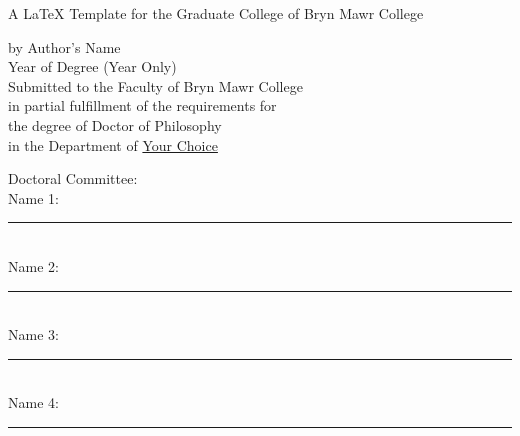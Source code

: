 \thispagestyle{plain}
\begin{titlepage}
   
   \begin{center}
        \vspace*{1in}
        A LaTeX Template for the Graduate College of Bryn Mawr College
        \vspace{2.0in} 
        
        by Author's Name\\
        Year of Degree (Year Only)\\
        \vspace{1.0in}
        \singlespace
        Submitted to the Faculty of Bryn Mawr College\\
        in partial fulfillment of the requirements for\\
        the degree of Doctor of Philosophy\\
        in the Department of \underline{Your Choice}
        \vspace{2.0in}
        
   \end{center}
   \singlespace
   Doctoral Committee:\\
   \noindent Name 1:~\rule{4cm}{0.15mm}\\
   Name 2:~\rule{4cm}{0.15mm}\\
   Name 3:~\rule{4cm}{0.15mm}\\
   Name 4:~\rule{4cm}{0.15mm}
\end{titlepage}